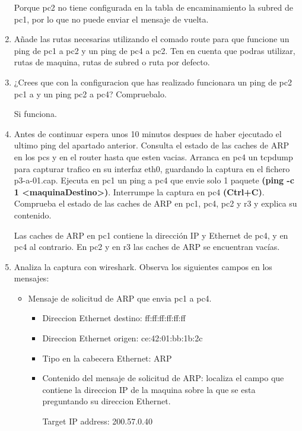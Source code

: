 \documentclass[12pt, a4paper]{report}
\begin{document}
\begin{enumerate}
	Porque pc2 no tiene configurada en la tabla de encaminamiento la subred de pc1, por lo que no puede enviar el mensaje de vuelta.
	\item Añade las rutas necesarias utilizando el comado route para que funcione un ping de pc1 a pc2 y un ping de pc4 a pc2.
	Ten en cuenta que podras utilizar, rutas de maquina, rutas de subred o ruta por defecto.
	
	
	\item ¿Crees que con la configuracion que has realizado funcionara un ping de pc2 pc1 a y un ping pc2 a pc4? Compruebalo.
	
	Si funciona.
	\item Antes de continuar espera unos 10 minutos despues de haber 
		ejecutado el ultimo ping del apartado anterior.
		Consulta el estado de las caches de ARP en los pcs y en el router hasta que esten vacias.
		\newline
		Arranca en pc4 un tcpdump para capturar trafico en su interfaz eth0, guardando la captura en el fichero
		\color{blue}p3-a-01.cap.
		\newline
		\color{black}
		Ejecuta en pc1 un ping a pc4 que envie solo 1 paquete \textbf{(ping -c 1 \textless maquinaDestino\textgreater)}. \newline
		Interrumpe la captura en pc4 \textbf{(Ctrl+C)}. \newline
		Comprueba el estado de las caches de ARP en pc1, pc4, pc2 y r3 y explica su contenido.
		
		Las caches de ARP en pc1 contiene la dirección IP y Ethernet de pc4, y en pc4 al contrario. En pc2 y en r3 las caches de ARP se encuentran vacías.
	\item Analiza la captura con wireshark. Observa los siguientes campos en los mensajes:
	\begin{itemize}
		\item Mensaje de solicitud de ARP que envia pc1 a pc4.
		\begin{itemize}
			\item Direccion Ethernet destino: ff:ff:ff:ff:ff:ff
			\item Direccion Ethernet origen: ce:42:01:bb:1b:2c
			\item Tipo en la cabecera Ethernet: ARP
			\item Contenido del mensaje de solicitud de ARP: localiza el campo que contiene la direccion IP de la
			maquina sobre la que se esta preguntando su direccion Ethernet.
			
			Target IP address: 200.57.0.40
			

\end{itemize}
\end{itemize}
\end{enumerate}
\end{document}
